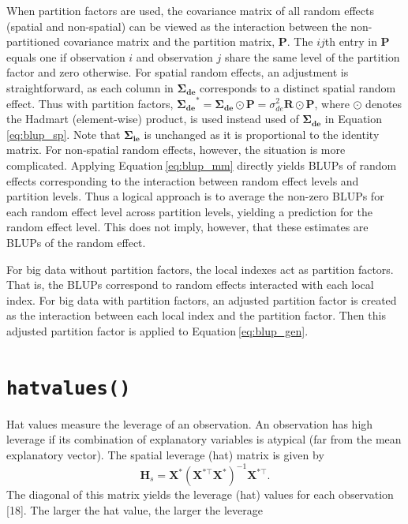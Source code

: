 \documentclass[10pt,letterpaper]{article}
\begin{document}
When partition factors are used, the covariance matrix of all random
effects (spatial and non-spatial) can be viewed as the interaction
between the non-partitioned covariance matrix and the partition matrix,
\(\mathbf{P}\). The \(ij\)th entry in \(\mathbf{P}\) equals one if
observation \(i\) and observation \(j\) share the same level of the
partition factor and zero otherwise. For spatial random effects, an
adjustment is straightforward, as each column in
\(\boldsymbol{\Sigma_{de}}\) corresponds to a distinct spatial random
effect. Thus with partition factors,
\(\boldsymbol{\Sigma_{de}}^* = \boldsymbol{\Sigma_{de}} \odot \mathbf{P} = \sigma^2_{de} \mathbf{R} \odot \mathbf{P}\),
where \(\odot\) denotes the Hadmart (element-wise) product, is used
instead used of \(\boldsymbol{\Sigma_{de}}\) in
Equation\(~\)\ref{eq:blup_sp}. Note that \(\boldsymbol{\Sigma_{ie}}\) is
unchanged as it is proportional to the identity matrix. For non-spatial
random effects, however, the situation is more complicated. Applying
Equation\(~\)\ref{eq:blup_mm} directly yields BLUPs of random effects
corresponding to the interaction between random effect levels and
partition levels. Thus a logical approach is to average the non-zero
BLUPs for each random effect level across partition levels, yielding a
prediction for the random effect level. This does not imply, however,
that these estimates are BLUPs of the random effect.

For big data without partition factors, the local indexes act as
partition factors. That is, the BLUPs correspond to random effects
interacted with each local index. For big data with partition factors,
an adjusted partition factor is created as the interaction between each
local index and the partition factor. Then this adjusted partition
factor is applied to Equation\(~\)\ref{eq:blup_gen}.

\hypertarget{sec:hatvalues}{%
\section{\texorpdfstring{\texttt{hatvalues()}}{hatvalues()}}\label{sec:hatvalues}}

Hat values measure the leverage of an observation. An observation has
high leverage if its combination of explanatory variables is atypical
(far from the mean explanatory vector). The spatial leverage (hat)
matrix is given by \begin{equation}
\label{eq:leverage}
 \mathbf{H}_s = \mathbf{X}^* (\mathbf{X}^{* \top} \mathbf{X}^*)^{-1} \mathbf{X}^{* \top}.
\end{equation} The diagonal of this matrix yields the leverage (hat)
values for each observation {[}18{]}. The larger the hat value, the
larger the leverage
\end{document}
